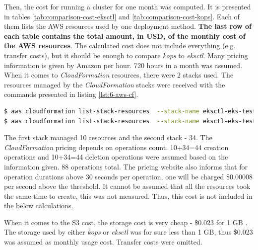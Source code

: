 Then, the cost for running a cluster for one month was computed. It is presented in tables \ref{tab:comparison-cost-eksctl} and \ref{tab:comparison-cost-kops}. Each of them lists the AWS resources used by one deployment method. \textbf{The last row of each table contains the total amount, in USD, of the monthly cost of the AWS resources}. The calculated cost does not include everything (e.g. transfer costs), but it should be enough to compare \textit{kops} to \textit{eksctl}. Many pricing information is given by Amazon per hour. 720 hours in a month was assumed. When it comes to \textit{CloudFormation} resources, there were 2 stacks used. The resources managed by the \textit{CloudFormation} stacks were received with the commands presented in listing \ref{lst:6-aws-cf}.
\begin{lstlisting}[basicstyle=\scriptsize,xleftmargin=0cm, label=lst:6-aws-cf,caption={AWS CLI commands used to list CloudFormation resources used by \textit{eksctl}},captionpos=b,language=Bash]
$ aws cloudformation list-stack-resources  --stack-name eksctl-eks-testing-nodegroup-ng-1
$ aws cloudformation list-stack-resources  --stack-name eksctl-eks-testing-cluster
\end{lstlisting}
The first stack managed 10 resources and the second stack - 34. The \textit{CloudFormation} pricing \cite{amazon-cf-pricing} depends on operations count. 10+34=44 creation operations and 10+34=44 deletion operations were assumed based on the information given. 88 operations total. The pricing website also informs that for operation durations above 30 seconds per operation, one will be charged \$0.00008 per second above the threshold. It cannot be assumed that all the resources took the same time to create, this was not measured. Thus, this cost is not included in the below calculations.

When it comes to the S3 cost, the storage cost is very cheap - \$0.023 for 1 GB \cite{s3-pricing}. The storage used by either \textit{kops} or \textit{eksctl} was for sure less than 1 GB, thus \$0.023 was assumed as monthly usage cost. Transfer costs were omitted.


